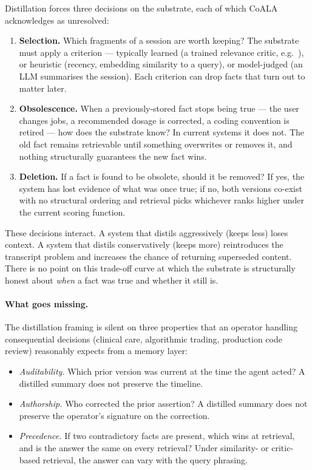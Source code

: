 \documentclass[11pt,a4paper]{article}
\begin{document}
Distillation forces three decisions on the substrate, each of which CoALA acknowledges
as unresolved:

\begin{enumerate}[leftmargin=2em,itemsep=2pt]
  \item \textbf{Selection.} Which fragments of a session are worth keeping? The
        substrate must apply a criterion --- typically learned (a trained relevance
        critic, e.g.~\cite{asai2023selfrag,yan2024crag}), or heuristic (recency,
        embedding similarity to a query), or model-judged (an LLM summarises the
        session). Each criterion can drop facts that turn out to matter later.
  \item \textbf{Obsolescence.} When a previously-stored fact stops being true --- the
        user changes jobs, a recommended dosage is corrected, a coding convention is
        retired --- how does the substrate know? In current systems it does not. The
        old fact remains retrievable until something overwrites or removes it, and
        nothing structurally guarantees the new fact wins.
  \item \textbf{Deletion.} If a fact is found to be obsolete, should it be removed?
        If yes, the system has lost evidence of what was once true; if no, both
        versions co-exist with no structural ordering and retrieval picks whichever
        ranks higher under the current scoring function.
\end{enumerate}

These decisions interact. A system that distils aggressively (keeps less) loses
context. A system that distils conservatively (keeps more) reintroduces the transcript
problem and increases the chance of returning superseded content. There is no point on
this trade-off curve at which the substrate is structurally honest about \emph{when} a
fact was true and whether it still is.

\paragraph{What goes missing.} The distillation framing is silent on three properties
that an operator handling consequential decisions (clinical care, algorithmic trading,
production code review) reasonably expects from a memory layer:

\begin{itemize}[leftmargin=2em,itemsep=2pt]
  \item \emph{Auditability.} Which prior version was current at the time the agent
        acted? A distilled summary does not preserve the timeline.
  \item \emph{Authorship.} Who corrected the prior assertion? A distilled summary
        does not preserve the operator's signature on the correction.
  \item \emph{Precedence.} If two contradictory facts are present, which wins at
        retrieval, and is the answer the same on every retrieval? Under similarity-
        or critic-based retrieval, the answer can vary with the query phrasing.
\end{itemize}
\end{document}
